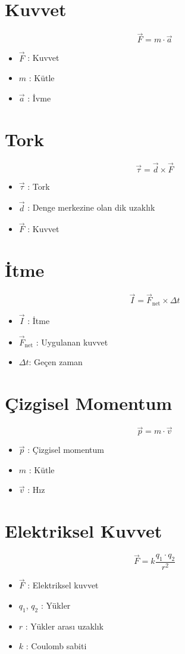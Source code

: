 \documentclass[a4paper, 11pt, titlepage]{article}
\begin{document}
\section{Kuvvet}
\[
\vec{F} =m\cdot\vec{a}
\]
\begin{itemize}
\item $\vec{F}$ : Kuvvet
\item $m$ : Kütle
\item $\vec{a}$ : İvme
\end{itemize}

\section{Tork}
\[
\vec{\tau} = \vec{d} \times \vec{F}
\]
\begin{itemize}
  \item $\vec{\tau}$ : Tork
  \item $\vec{d}$ : Denge merkezine olan dik uzaklık
  \item $\vec{F}$ : Kuvvet
\end{itemize}

\section{İtme}
\[
\vec{I} = \vec{F}_{\mathrm{net}} \times \Delta t
\]
\begin{itemize}
  \item $\vec{I}$ : İtme
  \item $\vec{F}_{\mathrm{net}}$ : Uygulanan kuvvet
  \item $\Delta t$: Geçen zaman
\end{itemize}


\section{Çizgisel Momentum}
\[
\vec{p} = m \cdot \vec{v}
\]
\begin{itemize}
  \item $\vec{p}$ : Çizgisel momentum
  \item $m$ : Kütle
  \item $\vec{v}$ : Hız
\end{itemize}

\section{Elektriksel Kuvvet}
\[
\vec{F} = k \frac{q_1 \cdot q_2}{r^2}
\]
\begin{itemize}
  \item $\vec{F}$ : Elektriksel kuvvet
  \item $q_1$, $q_2$ : Yükler
  \item $r$ : Yükler arası uzaklık
  \item $k$ : Coulomb sabiti
\end{itemize}
\end{document}
